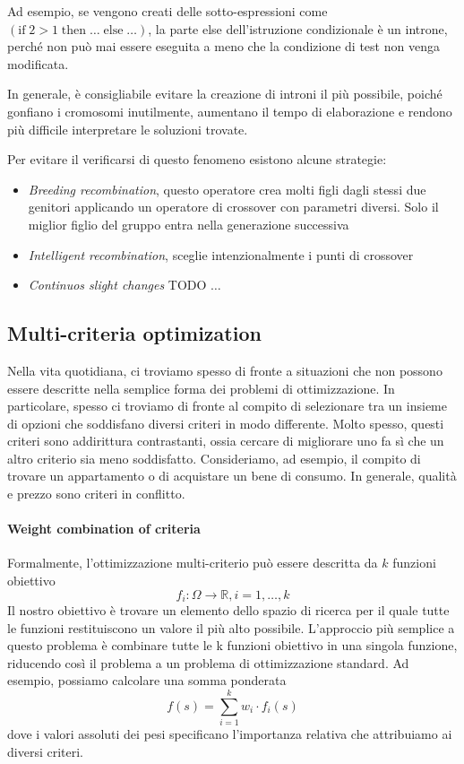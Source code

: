 Ad esempio, se vengono creati delle sotto-espressioni come $(\text{if}\;2 > 1\; \text{then}\; \dots\; \text{else}\; \dots)$, la parte else dell'istruzione condizionale è un introne, perché non può mai essere eseguita a meno che la condizione di test non venga modificata.

In generale, è consigliabile evitare la creazione di introni il più possibile, poiché gonfiano i cromosomi inutilmente, aumentano il tempo di elaborazione e rendono più difficile interpretare le soluzioni trovate.

Per evitare il verificarsi di questo fenomeno esistono alcune strategie:
\begin{itemize}
    \item \textit{Breeding recombination}, questo operatore crea molti figli dagli stessi due genitori applicando un operatore di crossover con parametri diversi. Solo il miglior figlio del gruppo entra nella generazione successiva
    \item \textit{Intelligent recombination}, sceglie intenzionalmente i punti di crossover
    \item \textit{Continuos slight changes} TODO $\dots$
\end{itemize}

\subsection{Multi-criteria optimization}
Nella vita quotidiana, ci troviamo spesso di fronte a situazioni che non possono essere descritte nella semplice forma dei problemi di ottimizzazione. In particolare, spesso ci troviamo di fronte al compito di selezionare tra un insieme di opzioni che soddisfano diversi criteri in modo differente. Molto spesso, questi criteri sono addirittura contrastanti, ossia cercare di migliorare uno fa sì che un altro criterio sia meno soddisfatto. Consideriamo, ad esempio, il compito di trovare un appartamento o di acquistare un bene di consumo. In generale, qualità e prezzo sono criteri in conflitto.

\paragraph{Weight combination of criteria}
Formalmente, l'ottimizzazione multi-criterio può essere descritta da $k$ funzioni obiettivo
$$f_i : \Omega \rightarrow \mathbb{R}, i = 1, \dots, k$$
Il nostro obiettivo è trovare un elemento dello spazio di ricerca per il quale tutte le funzioni restituiscono un valore il più alto possibile. L'approccio più semplice a questo problema è combinare tutte le k funzioni obiettivo in una singola funzione, riducendo così il problema a un problema di ottimizzazione standard. Ad esempio, possiamo calcolare una somma ponderata
$$f(s) = \sum^k_{i=1} w_i \cdot f_i(s)$$
dove i valori assoluti dei pesi specificano l'importanza relativa che attribuiamo ai diversi criteri. 


